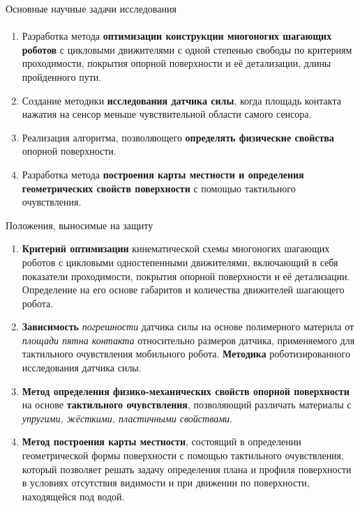 \begin{frame}[t]{Основные научные задачи исследования}
    \framesubtitle{}
    \begin{enumerate}
        \item Разработка метода \textbf{оптимизации конструкции многоногих шагающих роботов} с цикловыми движителями с одной степенью свободы по критериям проходимости, покрытия опорной поверхности и её детализации, длины пройденного пути.
        \item Создание методики \textbf{исследования датчика силы}, когда площадь контакта нажатия на сенсор меньше чувствительной области самого сенсора.
        \item Реализация алгоритма, позволяющего \textbf{определять физические свойства} опорной поверхности.
        \item  Разработка метода \textbf{построения карты местности и определения геометрических свойств поверхности} с помощью тактильного очувствления.
    \end{enumerate}
\end{frame}



\begin{frame}{Положения, выносимые на защиту}
    \begin{enumerate}
        \vspace{-0.3cm}
        \small
        \item \textbf{Критерий оптимизации} кинематической схемы многоногих шагающих роботов с цикловыми одностепенными движителями, включающий в себя показатели проходимости, покрытия опорной поверхности и её детализации. Определение на его основе габаритов и количества движителей шагающего робота.
        \item \textbf{Зависимость} \textit{погрешности} датчика силы на основе полимерного материла от \textit{площади пятна контакта} относительно размеров датчика, применяемого для тактильного очувствления мобильного робота. \textbf{Методика} роботизированного исследования датчика силы.
        \item \textbf{Метод определения физико-механических свойств опорной поверхности} на основе \textbf{тактильного очувствления}, позволяющий различать материалы с \textit{упругими, жёсткими, пластичными свойствами}.
        \item \textbf{Метод построения карты местности}, состоящий в определении геометрической формы поверхности с помощью тактильного очувствления, который позволяет решать задачу определения плана и профиля поверхности в условиях отсутствия видимости и при движении по поверхности, находящейся под водой.
    \end{enumerate}
\end{frame}

